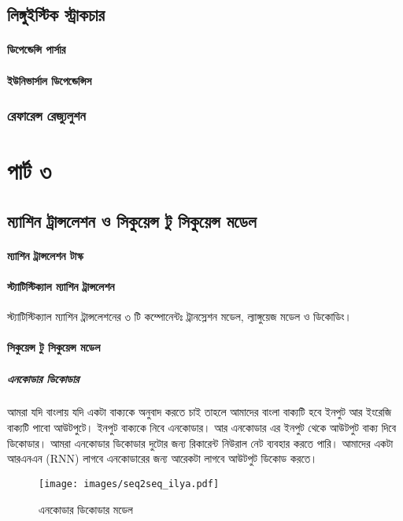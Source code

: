 \documentclass{book}
\begin{document}
\chapter{লিঙ্গুইস্টিক স্ট্রাকচার}
\subsection{ডিপেন্ডেন্সি পার্সার}
\subsection{ইউনিভার্সাল ডিপেন্ডেন্সিস}

\section{রেফারেন্স রেজ্যুলুশন}

 \part{পার্ট ৩} 


\chapter{ম্যাশিন ট্রান্সলেশন ও  সিকুয়েন্স টু সিকুয়েন্স মডেল}
\subsection{ম্যাশিন ট্রান্সলেশন টাস্ক}
\subsection{স্ট্যাটিস্টিক্যাল ম্যাশিন ট্রান্সলেশন} 
স্ট্যাটিস্টিক্যাল ম্যাশিন ট্রান্সলেশনের ৩ টি কম্পোনেন্টঃ ট্রানস্লেশন মডেল, ল্যাঙ্গুয়েজ মডেল ও  ডিকোডিং। 

\subsection{সিকুয়েন্স টু সিকুয়েন্স মডেল} 
\subsubsection{এনকোডার ডিকোডার}
আমরা যদি বাংলায় যদি একটা বাক্যকে অনুবাদ করতে চাই তাহলে আমাদের বাংলা বাক্যটি হবে ইনপুট আর ইংরেজি বাক্যটি পাবো আউটপুটে। 
ইনপুট বাক্যকে নিবে এনকোডার। আর এনকোডার এর ইনপুট থেকে আউটপুট বাক্য দিবে ডিকোডার। আমরা এনকোডার ডিকোডার দুটোর জন্য রিকারেন্ট নিউরাল নেট ব্যবহার করতে পারি।
আমাদের একটা আরএনএন (RNN)  লাগবে এনকোডারের জন্য আরেকটা লাগবে আউটপুট ডিকোড করতে। 
\begin{figure}[htbp] %
   \centering
   \texttt{[image: images/seq2seq\_ilya.pdf]} 
   \caption{এনকোডার ডিকোডার মডেল }
   \label{fig:seq2seq}
\end{figure} 
\end{document}
